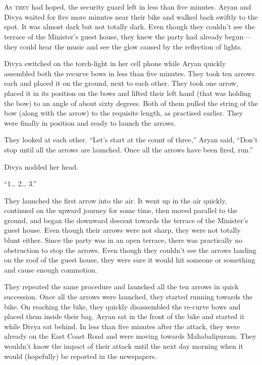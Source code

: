 \chapter{}

\lettrine{A}{s they} had hoped, the security guard left in less than five minutes. Aryan and
Divya waited for five more minutes near their bike and walked back swiftly to
the spot. It was almost dark but not totally dark. Even though they couldn't see
the terrace of the Minister's guest house, they knew the party had already
begun—they could hear the music and see the glow caused by the reflection of
lights.


Divya switched on the torch-light in her cell phone while Aryan quickly
assembled both the recurve bows in less than five minutes. They took ten arrows
each and placed it on the ground, next to each other. They took one arrow,
placed it in its position on the bows and lifted their left hand (that was
holding the bow) to an angle of about sixty degrees. Both of them pulled the
string of the bow (along with the arrow) to the requisite length, as practised
earlier. They were finally in position and ready to launch the arrows.

They looked at each other. “Let's start at the count of three,” Aryan said,
“Don't stop until all the arrows are launched. Once all the arrows have been
fired, run.”

Divya nodded her head.

“1… 2… 3.”

They launched the first arrow into the air. It went up in the air quickly,
continued on the upward journey for some time, then moved parallel to the ground,
and began the downward descent towards the terrace of the Minister's guest
house. Even though their arrows were not sharp, they were not totally blunt
either. Since the party was in an open terrace, there was practically no
obstruction to stop the arrows. Even though they couldn't see the arrows landing
on the roof of the guest house, they were sure it would hit someone or something
and cause enough commotion.

They repeated the same procedure and launched all the ten arrows in quick
succession. Once all the arrows were launched, they started running towards the
bike. On reaching the bike, they quickly disassembled the re-curve bows and
placed them inside their bag. Aryan sat in the front of the bike and started it
while Divya sat behind. In less than five minutes after the attack, they were
already on the East Coast Road and were moving towards Mahabalipuram. They
wouldn't know the impact of their attack until the next day morning when it
would (hopefully) be reported in the newspapers.

